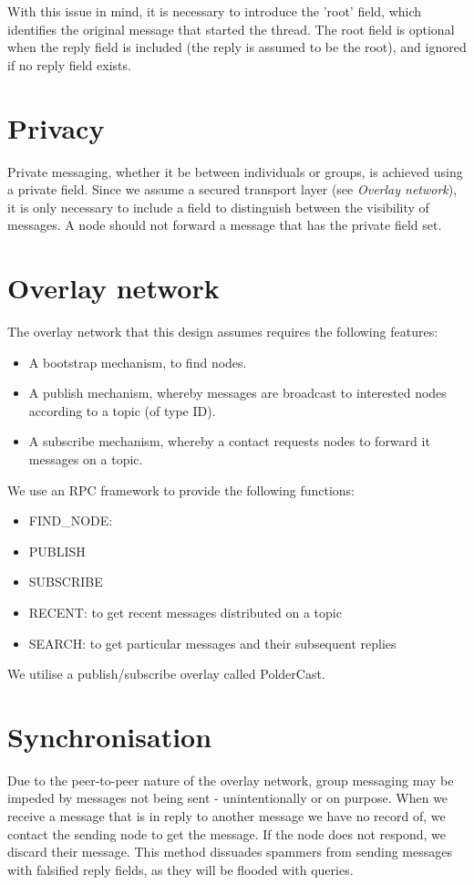 \documentclass[10pt,a4paper,onecolumn]{article}
\begin{document}
With this issue in mind, it is necessary to introduce the 'root' field, which identifies the original message that started the thread. The root field is  optional when the reply field is included (the reply is assumed to be the root), and ignored if no reply field exists.


\section{Privacy}
Private messaging, whether it be between individuals or groups, is achieved using a private field. Since we assume a secured transport layer (see \textit{Overlay network}), it is only necessary to include a field to distinguish between the visibility of messages. A node should not forward a message that has the private field set. 


\section{Overlay network}
The overlay network that this design assumes requires the following features:
\begin{itemize}
\item A bootstrap mechanism, to find nodes.
\item A publish mechanism, whereby messages are broadcast to interested nodes according to a topic (of type ID).
\item A subscribe mechanism, whereby a contact requests nodes to forward it messages on a topic.
\end{itemize}

We use an RPC framework to provide the following functions:
\begin{itemize}
\item FIND\_NODE: 
\item PUBLISH
\item SUBSCRIBE
\item RECENT: to get recent messages distributed on a topic
\item SEARCH: to get particular messages and their subsequent replies
\end{itemize}

We utilise a publish/subscribe overlay called PolderCast. 


\section{Synchronisation}
Due to the peer-to-peer nature of the overlay network, group messaging may be impeded by messages not being sent - unintentionally or on purpose. When we receive a message that is in reply to another message we have no record of, we contact the sending node to get the message. If the node does not respond, we discard their message. This method dissuades spammers from sending messages with falsified reply fields, as they will be flooded with queries. 
\end{document}

